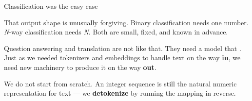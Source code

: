 \documentclass[aspectratio=169,11pt,t]{beamer}
\begin{document}

\begin{frame}[shrink=25]{Classification was the easy case}
{\fontsize{9.4}{12.6}\selectfont\color{fg2}That output shape is unusually forgiving. Binary classification needs one number. \textit{N}-way classification needs \textit{N}. Both are small, fixed, and known in advance.\par}\vskip 4pt
{\fontsize{9.4}{12.6}\selectfont\color{fg2}Question answering and translation are not like that. They need a model that . Just as we needed tokenizers and embeddings to handle text on the way \textbf{in}, we need new machinery to produce it on the way \textbf{out}.\par}\vskip 4pt
\begin{iband}[signal]
We do not start from scratch. An integer sequence is still the natural numeric representation for text --- we \textbf{detokenize} by running the mapping in reverse.
\end{iband}
\end{frame}
\end{document}
